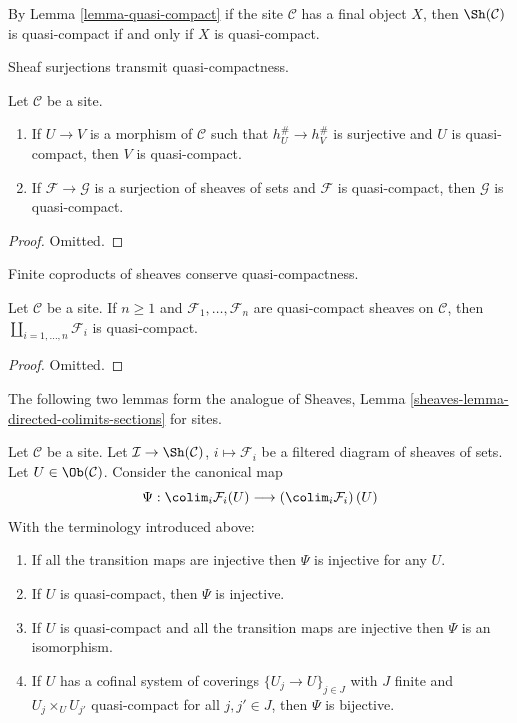 \noindent
By Lemma \ref{lemma-quasi-compact}
if the site $\mathcal{C}$ has a final object $X$, then
$\Sh(\mathcal{C})$ is quasi-compact if and only if $X$ is quasi-compact.

\begin{lemma}
\label{lemma-image-of-quasi-compact}
\begin{slogan}
Sheaf surjections transmit quasi-compactness.
\end{slogan}
Let $\mathcal{C}$ be a site.
\begin{enumerate}
\item If $U \to V$ is a morphism of $\mathcal{C}$ such that
$h_U^\# \to h_V^\#$ is surjective and $U$ is quasi-compact, then
$V$ is quasi-compact.
\item If $\mathcal{F} \to \mathcal{G}$ is a surjection of sheaves
of sets and $\mathcal{F}$ is quasi-compact, then $\mathcal{G}$
is quasi-compact.
\end{enumerate}
\end{lemma}

\begin{proof}
Omitted.
\end{proof}

\begin{lemma}
\label{lemma-coproduct-quasi-compact}
\begin{slogan}
Finite coproducts of sheaves conserve quasi-compactness.
\end{slogan}
Let $\mathcal{C}$ be a site. If $n \geq 1$ and
$\mathcal{F}_1, \ldots, \mathcal{F}_n$ are quasi-compact
sheaves on $\mathcal{C}$, then $\coprod_{i = 1, \ldots, n} \mathcal{F}_i$
is quasi-compact.
\end{lemma}

\begin{proof}
Omitted.
\end{proof}

\noindent
The following two lemmas form the analogue of
Sheaves, Lemma \ref{sheaves-lemma-directed-colimits-sections}
for sites.

\begin{lemma}
\label{lemma-directed-colimits-sections}
Let $\mathcal{C}$ be a site. Let
$\mathcal{I} \to \Sh(\mathcal{C})$, $i \mapsto \mathcal{F}_i$
be a filtered diagram of sheaves of sets.
Let $U \in \Ob(\mathcal{C})$.
Consider the canonical map
$$
\Psi :
\colim_i \mathcal{F}_i(U)
\longrightarrow
\left(\colim_i \mathcal{F}_i\right)(U)
$$
With the terminology introduced above:
\begin{enumerate}
\item If all the transition maps are injective then
$\Psi$ is injective for any $U$.
\item If $U$ is quasi-compact, then $\Psi$ is injective.
\item If $U$ is quasi-compact and all the transition maps are injective
then $\Psi$ is an isomorphism.
\item If $U$ has a cofinal system of coverings
$\{U_j \to U\}_{j \in J}$ with
$J$ finite and $U_j \times_U U_{j'}$ quasi-compact
for all $j, j' \in J$, then $\Psi$ is bijective.
\end{enumerate}
\end{lemma}

